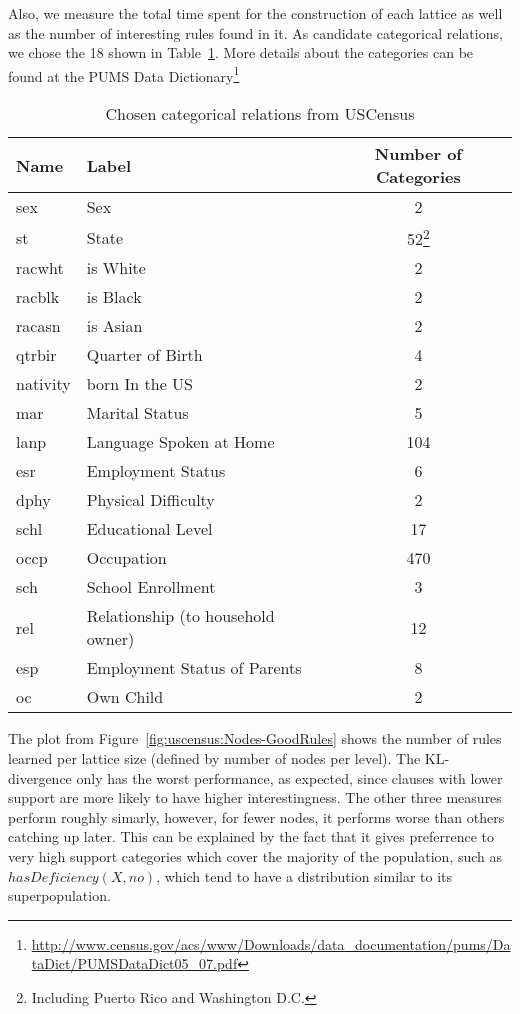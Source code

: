 Also, we measure the total time spent for the construction of each lattice as well as the number of interesting rules
found in it. As candidate categorical relations, we chose the 18 shown in Table~\ref{tab:uscensusRelations}. More
details about the categories can be found at the PUMS
Data
Dictionary\footnote{\url{http://www.census.gov/acs/www/Downloads/data_documentation/pums/DataDict/PUMSDataDict05_07.pdf}
}

\begin{table}[h!]
\begin{minipage}{\textwidth}
 \begin{center}
 \caption{Chosen categorical relations from USCensus}
  \begin{tabular}{l l c}
    \toprule
      Name	& Label				& Number of Categories \\
    \midrule
      sex	& Sex				&	2	\\
      st	& State				&	52\footnote{Including Puerto Rico and Washington D.C.}	\\
      racwht	& is White			&	2	\\
      racblk	& is Black			&	2	\\
      racasn	& is Asian			&	2	\\
      qtrbir	& Quarter of Birth		&	4	\\	
      nativity	& born In the US		&	2	\\
      mar	& Marital Status		&	5	\\
      lanp	& Language Spoken at Home	&	104	\\
      esr	& Employment Status		&	6	\\
      dphy	& Physical Difficulty		&	2	\\
      schl	& Educational Level		&	17	\\	
      occp	& Occupation			&	470	\\
      sch	& School Enrollment		&	3	\\
      rel	& Relationship (to household owner)		&	12	\\
      esp	& Employment Status of Parents	&	8	\\
      oc	& Own Child			&	2	\\
    \bottomrule
  \end{tabular}
 \label{tab:uscensusRelations}
 \end{center}
\end{minipage}
\end{table}

The plot from Figure~\ref{fig:uscensus:Nodes-GoodRules} shows the number of rules learned per lattice size (defined by
number of nodes per level). The KL-divergence only has the worst performance, as expected, since clauses with lower
support are more likely to have higher interestingness. The other three measures perform roughly simarly, however, for
fewer nodes, it performs worse than others catching up later. This can be explained by the fact that it gives
preferrence to very high support categories which cover the majority of the population, such as $hasDeficiency(X,no)$,
which tend to have a distribution similar to its superpopulation. 

